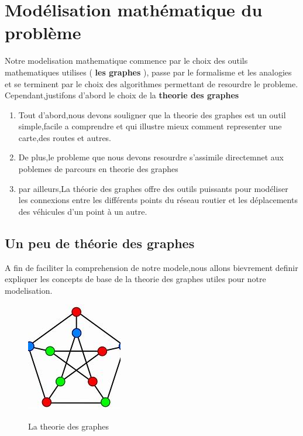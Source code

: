 
\section{Modélisation mathématique du problème}
Notre modelisation mathematique commence par le choix des outils mathematiques utilises ( \textbf{les graphes} ),
passe par le formalisme et les analogies et se terminent par le choix des algorithmes permettant de resourdre le probleme.\\

Cependant,justifons d'abord le choix de la \textbf{theorie des graphes}
\begin{enumerate}
    \item Tout d'abord,nous devons souligner que la theorie des graphes est un outil simple,facile a comprendre et qui illustre mieux comment representer une carte,des routes et autres.
    \item De plus,le probleme que nous devons resourdre s'assimile directemnet aux poblemes de parcours en  theorie des graphes
    \item par ailleurs,La théorie des graphes offre des outils puissants pour modéliser les connexions entre les différents points du réseau routier et les déplacements des véhicules d'un point à un autre.
\end{enumerate}




\subsection{Un peu de théorie des graphes}
A fin de faciliter la comprehension de notre modele,nous allons bievrement definir expliquer les concepts de base de la theorie des graphes utiles pour notre modelisation.

\begin{figure}[h]
    \centering
    \includegraphics[width=0.5\linewidth]{Images/Theory.jpeg}
    \caption{La theorie des graphes}
    \label{fig:un peu de theorie des graphes}
    \cite{graph_image}
\end{figure}


